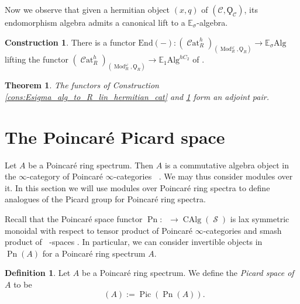 \documentclass{article}
\DeclareMathOperator{\CAlg}{CAlg} %
\DeclareMathOperator{\Cat}{\mathcal{C}at} %
\DeclareMathOperator{\Catp}{Cat^p_\infty} %
\DeclareMathOperator{\Einfty}{\mathbf{E}_\infty} %
\DeclareMathOperator{\Mod}{Mod} %
\DeclareMathOperator{\Pic}{Pic} %
\DeclareMathOperator{\Picp}{Pic^p} %
\DeclareMathOperator{\Pn}{Pn} %
\DeclareMathOperator{\Spaces}{\mathcal{S}} %
\newtheorem{theorem}[equation]{Theorem}
\theoremstyle{definition}
\newtheorem{definition}[equation]{Definition}
\newtheorem{construction}[equation]{Construction}
\newcommand{\Viktor}[1]{\todo{V: #1}}
\begin{document}
Now we observe that given a hermitian object $ (x,q) $ of $ \left(\mathcal{C}, \Qoppa_\mathcal{C}\right) $, its endomorphism algebra admits a canonical lift to a $ \mathbb{E}_\sigma $-algebra. 
\begin{construction}\label{cons:endomorphism_of_hermitian_obj}
    There is a functor $ \mathrm{End}(-)\colon \left(\Cat^h_R\right)_{\left(\Mod_R^\omega,\Qoppa_R\right)} \to \mathbb{E}_\sigma\mathrm{Alg} $ lifting the functor $ \left(\Cat^h_R\right)_{\left(\Mod_R^\omega,\Qoppa_R\right)} \to \mathbb{E}_1\mathrm{Alg}^{hC_2} $ of \cite[Proposition 3.1.16]{CDHHLMNNSI}. 
\end{construction}
\begin{theorem}
    The functors of Construction \ref{cons:Esigma_alg_to_R_lin_hermitian_cat} and \ref{cons:endomorphism_of_hermitian_obj} form an adjoint pair. 
\end{theorem}



\section{The Poincaré Picard space}
\label{subsection:the_poincare_picard_group}
Let $A$ be a Poincaré ring spectrum. Then $A$ is a commutative algebra object in the $\infty$-category of Poincaré $\infty$-categories $\Catp$\Viktor{ref}. We may thus consider modules over it. In this section we will use modules over Poincaré ring spectra to define analogues of the Picard group for Poincaré ring spectra.

Recall that the Poincaré space functor $ \Pn \colon \Catp \to \CAlg(\Spaces) $ is lax symmetric monoidal with respect to tensor product of Poincaré $ \infty $-categories and smash product of $ \Einfty $-spaces \cite[Corollary 5.2.8]{CDHHLMNNSI}. In particular, we can consider invertible objects in $\Pn(A)$ for a Poincaré ring spectrum $A$.

\begin{definition}
    \label{definition:poincare_picard_space}
    Let $A$ be a Poincaré ring spectrum. We define the \emph{Picard space of $A$} to be $$\Picp(A):=\Pic(\Pn(A)).$$
\end{definition}
\end{document}
